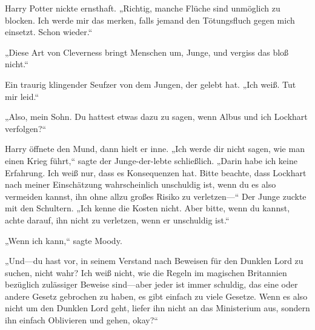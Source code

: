 Harry Potter nickte ernsthaft. „Richtig, manche Flüche sind unmöglich zu blocken. Ich werde mir das merken, falls jemand den Tötungsfluch gegen mich einsetzt. Schon wieder.“

„Diese Art von Cleverness bringt Menschen um, Junge, und vergiss das bloß nicht.“

Ein traurig klingender Seufzer von dem Jungen, der gelebt hat. „Ich weiß. Tut mir leid.“

„Also, mein Sohn. Du hattest etwas dazu zu sagen, wenn Albus und ich Lockhart verfolgen?“

Harry öffnete den Mund, dann hielt er inne. „Ich werde dir nicht sagen, wie man einen Krieg führt,“ sagte der Junge-der-lebte schließlich. „Darin habe ich keine Erfahrung. Ich weiß nur, dass es Konsequenzen hat. Bitte beachte, dass Lockhart nach meiner Einschätzung wahrscheinlich unschuldig ist, wenn du es also vermeiden kannst, ihn ohne allzu großes Risiko zu verletzen—“ Der Junge zuckte mit den Schultern. „Ich kenne die Kosten nicht. Aber bitte, wenn du kannst, achte darauf, ihn nicht zu verletzen, wenn er unschuldig ist.“

„Wenn ich kann,“ sagte Moody.

„Und—du hast vor, in seinem Verstand nach Beweisen für den Dunklen Lord zu suchen, nicht wahr? Ich weiß nicht, wie die Regeln im magischen Britannien bezüglich zulässiger Beweise sind—aber jeder ist immer schuldig, das eine oder andere Gesetz gebrochen zu haben, es gibt einfach zu viele Gesetze. Wenn es also nicht um den Dunklen Lord geht, liefer ihn nicht an das Ministerium aus, sondern ihn einfach Oblivieren und gehen, okay?“

